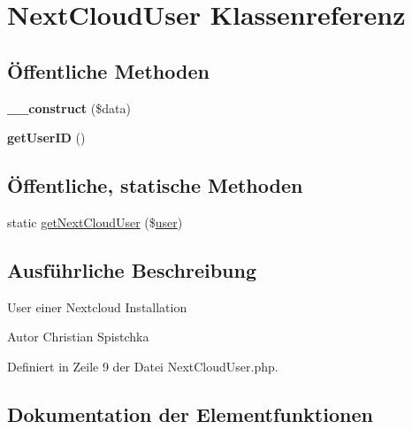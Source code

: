 \hypertarget{class_next_cloud_user}{}\section{Next\+Cloud\+User Klassenreferenz}
\label{class_next_cloud_user}
\subsection*{Öffentliche Methoden}
\begin{DoxyCompactItemize}
\item 
\mbox{\label{class_next_cloud_user_a810d0ff4c8061eaf3c7c3f78850f6b55}} 
{\bfseries \+\_\+\+\_\+construct} (\$data)
\item 
\mbox{\label{class_next_cloud_user_a5f28953b6cfd0265e6f900454dc06b1c}} 
{\bfseries get\+User\+ID} ()
\end{DoxyCompactItemize}
\subsection*{Öffentliche, statische Methoden}
\begin{DoxyCompactItemize}
\item 
static \mbox{\hyperlink{class_next_cloud_user_a5f100e3fcdaebfee01c568899630bfd7}{get\+Next\+Cloud\+User}} (\$\mbox{\hyperlink{classuser}{user}})
\end{DoxyCompactItemize}


\subsection{Ausführliche Beschreibung}
User einer Nextcloud Installation

\begin{DoxyAuthor}{Autor}
Christian Spistchka 
\end{DoxyAuthor}


Definiert in Zeile 9 der Datei Next\+Cloud\+User.\+php.



\subsection{Dokumentation der Elementfunktionen}
\mbox{\label{class_next_cloud_user_a5f100e3fcdaebfee01c568899630bfd7}} 
